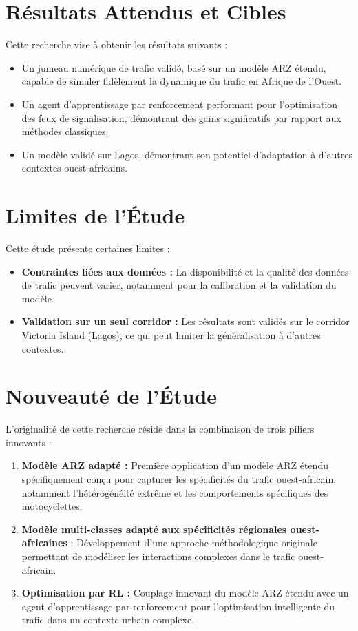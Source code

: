 \section{Résultats Attendus et Cibles}
\label{sec:resultats_attendus}

Cette recherche vise à obtenir les résultats suivants :
\begin{itemize}
    \item Un jumeau numérique de trafic validé, basé sur un modèle ARZ étendu, capable de simuler fidèlement la dynamique du trafic en Afrique de l'Ouest.
    \item Un agent d'apprentissage par renforcement performant pour l'optimisation des feux de signalisation, démontrant des gains significatifs par rapport aux méthodes classiques.
    \item Un modèle validé sur Lagos, démontrant son potentiel d'adaptation à d'autres contextes ouest-africains.
\end{itemize}

\section{Limites de l'Étude}
\label{sec:limites_etude}

Cette étude présente certaines limites :
\begin{itemize}
    \item \textbf{Contraintes liées aux données :} La disponibilité et la qualité des données de trafic peuvent varier, notamment pour la calibration et la validation du modèle.
    \item \textbf{Validation sur un seul corridor :} Les résultats sont validés sur le corridor Victoria Island (Lagos), ce qui peut limiter la généralisation à d'autres contextes.

\end{itemize}

\section{Nouveauté de l'Étude}
\label{sec:nouveaute_etude}

L'originalité de cette recherche réside dans la combinaison de trois piliers innovants :
\begin{enumerate}
    \item \textbf{Modèle ARZ adapté :} Première application d'un modèle ARZ étendu spécifiquement conçu pour capturer les spécificités du trafic ouest-africain, notamment l'hétérogénéité extrême et les comportements spécifiques des motocyclettes.
    \item \textbf{Modèle multi-classes adapté aux spécificités régionales ouest-africaines} : Développement d'une approche méthodologique originale permettant de modéliser les interactions complexes dans le trafic ouest-africain.
    \item \textbf{Optimisation par RL :} Couplage innovant du modèle ARZ étendu avec un agent d'apprentissage par renforcement pour l'optimisation intelligente du trafic dans un contexte urbain complexe.
\end{enumerate}

